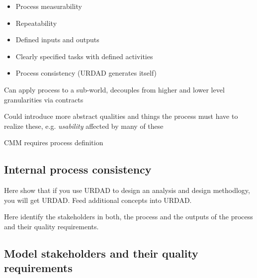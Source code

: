 \begin{itemize}
  \item Process measurability
  \item Repeatability
  \item Defined inputs and outputs
  \item Clearly specified tasks with defined activities
  \item Process consistency (URDAD generates itself)
\end{itemize}

Can apply process to a sub-world, decouples from higher and lower level granularities via contracts

Could introduce more abstract qualities and things the process must have to realize these, e.g. \emph{usability} affected by many of these

CMM requires process definition


\subsection{Internal process consistency}


Here show that if you use URDAD to design an analysis and design methodlogy, you will get URDAD. Feed additional concepts into URDAD.

Here identify the stakeholders in both, the process and the outputs of the process and their quality requirements.

\subsection{Model stakeholders and their quality requirements}